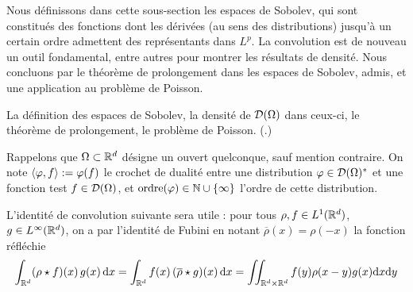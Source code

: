Nous définissons dans cette sous-section les espaces de Sobolev, qui sont constitués des fonctions dont les dérivées (au sens des distributions) jusqu'à un certain ordre admettent des représentants dans $L^p$. La convolution est de nouveau un outil fondamental, entre autres pour  montrer les résultats de densité. Nous concluons par le théorème de prolongement dans les espaces de Sobolev, admis, et une application au problème de Poisson.

\begin{retenir}
La définition des espaces de Sobolev, la densité de $\mathcal{D}(\Omega)$ dans ceux-ci, le théorème de prolongement, le problème de Poisson.
(.)	
\end{retenir}

Rappelons que $\Omega\subset \mathbb{R}^d$ désigne un ouvert quelconque, sauf mention contraire.
On note $\langle\varphi,f\rangle := \varphi(f)$ le crochet de dualité entre une distribution $\varphi \in \mathcal{D}(\Omega)^*$ et une fonction test $f \in \mathcal{D}(\Omega)$, 
et $\operatorname{ordre}(\varphi) \in \mathbb{N}\cup \{\infty\}$ l'ordre de cette distribution.


L'identité de convolution suivante sera utile : pour tous $\rho, f \in L^1(\mathbb{R}^d)$, $g \in L^\infty( \mathbb{R}^d)$, on a par l'identité de Fubini en notant $\overline \rho (x) = \rho(-x)$ la fonction réfléchie
\begin{equation*}
	\int_{\mathbb{R}^d} (\rho\star f) (x) \, g(x) \, \mathrm{d} x = 
	\int_{\mathbb{R}^d} f(x) \, (\overline \rho \star g)(x)\, \mathrm{d} x = 
	\iint_{\mathbb{R}^d\times \mathbb{R}^d} f(y) \rho(x-y) g(x) \mathrm{d} x \mathrm{d} y
\end{equation*}


%


